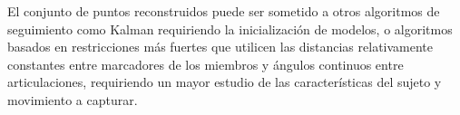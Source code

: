 El conjunto de puntos reconstruidos puede ser sometido a otros algoritmos de seguimiento como Kalman \cite{kalman} requiriendo la inicialización de modelos, o algoritmos basados en restricciones más fuertes que utilicen las distancias relativamente constantes entre marcadores de los miembros y ángulos continuos entre articulaciones, requiriendo un mayor estudio de las características del sujeto y movimiento a capturar. %

